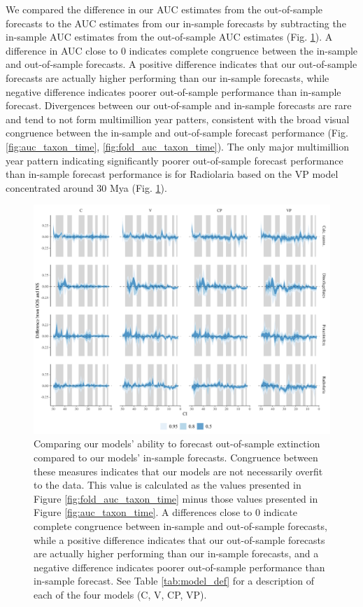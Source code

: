 \documentclass[12pt,letterpaper]{article}
\begin{document}
\begin{refsection}
We compared the difference in our AUC estimates from the out-of-sample forecasts to the AUC estimates from our in-sample forecasts by subtracting the in-sample AUC estimates from the out-of-sample AUC estimates (Fig. \ref{fig:oos_ins_diff}). A difference in AUC close to 0 indicates complete congruence between the in-sample and out-of-sample forecasts. A positive difference indicates that our out-of-sample forecasts are actually higher performing than our in-sample forecasts, while negative difference indicates poorer out-of-sample performance than in-sample forecast. Divergences between our out-of-sample and in-sample forecasts are rare and tend to not form multimillion year patters, consistent with the broad visual congruence between the in-sample and out-of-sample forecast performance (Fig. \ref{fig:auc_taxon_time}, \ref{fig:fold_auc_taxon_time}). The only major multimillion year pattern indicating significantly poorer out-of-sample forecast performance than in-sample forecast performance is for Radiolaria based on the VP model concentrated around 30 Mya (Fig. \ref{fig:oos_ins_diff}).

\begin{figure}[ht]
 \centering
 \includegraphics[width=\textwidth,height=0.5\textheight,keepaspectratio=true]{../results/figure/auc_diff}
 \caption{Comparing our models' ability to forecast out-of-sample extinction compared to our models' in-sample forecasts. Congruence between these measures indicates that our models are not necessarily overfit to the data. This value is calculated as the values presented in Figure \ref{fig:fold_auc_taxon_time} minus those values presented in Figure \ref{fig:auc_taxon_time}. A differences close to 0 indicate complete congruence between in-sample and out-of-sample forecasts, while a positive difference indicates that our out-of-sample forecasts are actually higher performing than our in-sample forecasts, and a negative difference indicates poorer out-of-sample performance than in-sample forecast. See Table \ref{tab:model_def} for a description of each of the four models (C, V, CP, VP).}
 \label{fig:oos_ins_diff}
\end{figure}




\end{refsection}
\end{document}
